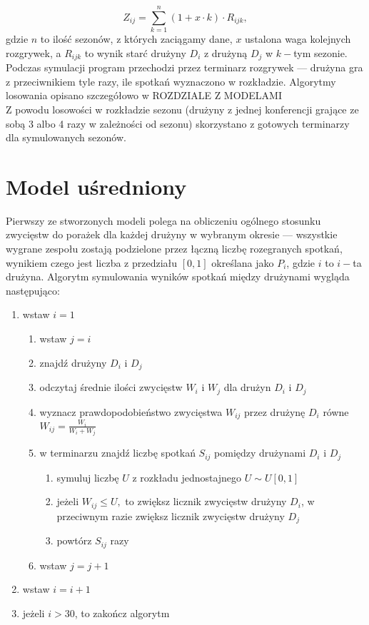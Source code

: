 \documentclass[inzynierska]{pwr_wmat_praca_dyplomowa}
\theoremstyle{plain}
\numberwithin{theorem}{chapter}
\theoremstyle{definition}
\numberwithin{theorem}{chapter}
\begin{document}
\begin{equation}
	Z_{ij} = \sum_{k=1}^{n} (1+x\cdot k)\cdot R_{ijk}, 
\end{equation}
gdzie $n$ to ilość sezonów, z których zaciągamy dane, $x$ ustalona waga kolejnych rozgrywek, a $R_{ijk}$ to wynik starć drużyny $D_i$ z drużyną $D_j$ w $k-$tym sezonie.     
\\
Podczas symulacji program przechodzi przez terminarz rozgrywek --- drużyna gra z przeciwnikiem tyle razy, ile spotkań wyznaczono w rozkładzie. Algorytmy losowania opisano szczegółowo w ROZDZIALE Z MODELAMI
\\
Z powodu losowości w rozkładzie sezonu (drużyny z jednej konferencji grające ze sobą 3 albo 4 razy w zależności od sezonu) skorzystano z gotowych terminarzy dla symulowanych sezonów.
\\



\section{Model uśredniony}
Pierwszy ze stworzonych modeli polega na obliczeniu ogólnego stosunku zwycięstw do porażek dla każdej drużyny w wybranym okresie --- wszystkie wygrane zespołu zostają podzielone przez łączną liczbę rozegranych spotkań, wynikiem czego jest liczba z przedziału $[0,1]$ określana jako $P_{i}$, gdzie $i$ to $i-$ta drużyna. Algorytm symulowania wyników spotkań między drużynami wygląda następująco:
\begin{enumerate}
	\item wstaw $i=1$
	\begin{enumerate}
		\item wstaw $j=i$
		\item znajdź drużyny $D_i$ i $D_j$
		\item odczytaj średnie ilości zwycięstw $W_i$ i $W_j$ dla drużyn $D_i$ i $D_j$ 
		\item wyznacz prawdopodobieństwo zwycięstwa $W_{ij}$ przez drużynę  $D_i$ równe $W_{ij}=\frac{W_i}{W_i + W_j}$   
		\item w terminarzu znajdź liczbę spotkań $S_{ij}$ pomiędzy drużynami $D_i$ i $D_j$
			\begin{enumerate}
				\item symuluj liczbę $U$ z rozkładu jednostajnego $U\sim U[0,1]$ 
			\item jeżeli $W_{ij} \leq U,$ to zwiększ licznik zwycięstw drużyny $D_i$, w przeciwnym razie zwiększ licznik zwycięstw drużyny $D_j$
			\item powtórz $S_{ij}$ razy
			\end{enumerate}
		\item wstaw $j=j+1$
	\end{enumerate}
	\item wstaw $i=i+1$
	\item jeżeli $i> 30$, to zakończ algorytm
\end{enumerate} 
\end{document}
